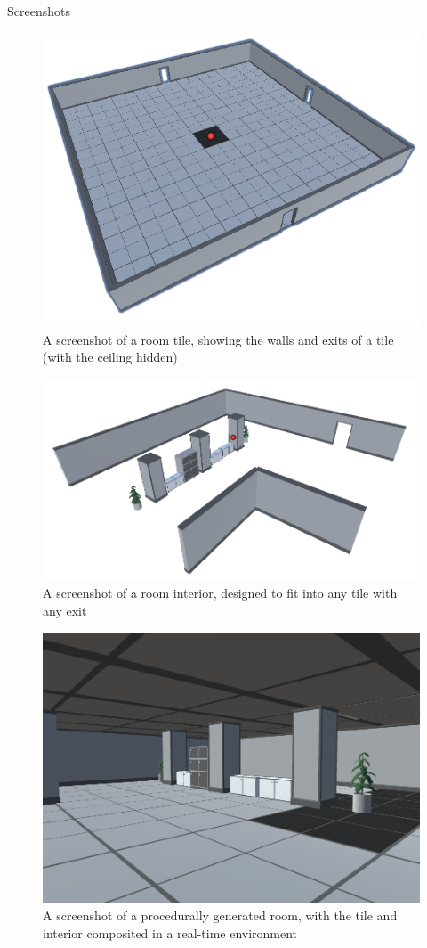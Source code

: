 \documentclass[progress]{cmpreport}
\begin{document}
\begin{section}{Screenshots}
    


\begin{figure}[H]
    \centering
    \includegraphics[width=.8\textwidth]{img/prefabroom.png}
    \caption{A screenshot of a room tile, showing the walls and exits of a tile (with the ceiling hidden)}
    \label{fig:prefab-room}
\end{figure}

\begin{figure}[H]
    \centering
    \includegraphics[width=.8\textwidth]{img/interior.png}
    \caption{A screenshot of a room interior, designed to fit into any tile with any exit}
    \label{fig:prefab-int}
\end{figure}

\begin{figure}[H]
    \centering
    \includegraphics[width=.8\textwidth]{img/imp-int.png}
    \caption{A screenshot of a procedurally generated room, with the tile and interior composited in a real-time environment}
    \label{fig:room}
\end{figure}




\end{section}
\end{document}
